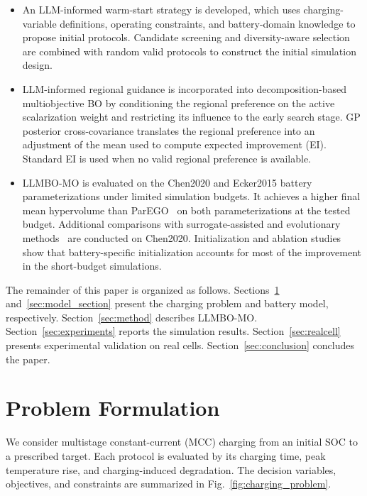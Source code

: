 \documentclass[journal,10pt]{IEEEtran}
\begin{document}
\begin{itemize}

    \item An LLM-informed warm-start strategy is developed, which uses
    charging-variable definitions, operating constraints, and battery-domain
    knowledge to propose initial protocols. Candidate screening and
    diversity-aware selection are combined with random valid protocols to
    construct the initial simulation design.

    \item LLM-informed regional guidance is incorporated into
    decomposition-based multiobjective BO by conditioning the regional
    preference on the active scalarization weight and restricting its
    influence to the early search stage. GP posterior cross-covariance
    translates the regional preference into an adjustment of the mean used
    to compute expected improvement (EI). Standard EI is used when no
    valid regional preference is available.

    \item LLMBO-MO is evaluated on the Chen2020 and Ecker2015 battery
    parameterizations under limited simulation budgets. It achieves a higher
    final mean hypervolume than ParEGO~\cite{ref4} on both parameterizations
    at the tested budget. Additional comparisons with surrogate-assisted
    and evolutionary methods~\cite{refDISK,refPIMD,refNSGAII} are conducted
    on Chen2020. Initialization and ablation studies show that battery-specific
    initialization accounts for most of the improvement in the short-budget
    simulations.

\end{itemize}

The remainder of this paper is organized as follows.
Sections~\ref{sec:problem} and~\ref{sec:model_section} present the charging
problem and battery model, respectively. Section~\ref{sec:method} describes
LLMBO-MO. Section~\ref{sec:experiments} reports the simulation results.
Section~\ref{sec:realcell} presents experimental validation on real cells.
Section~\ref{sec:conclusion} concludes the paper.

\section{Problem Formulation}
\label{sec:problem}

We consider multistage constant-current (MCC) charging from an initial SOC to
a prescribed target. Each protocol is evaluated by its charging time, peak
temperature rise, and charging-induced degradation. The decision variables,
objectives, and constraints are summarized in
Fig.~\ref{fig:charging_problem}.
\end{document}
